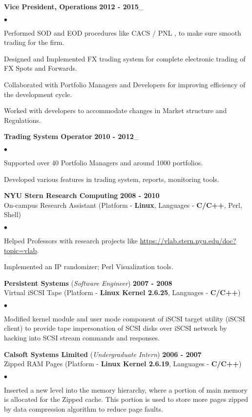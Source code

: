 \documentclass[margin,line]{res}
\newenvironment{list2}{
  \begin{list}{$\bullet$}{%
      \setlength{\itemsep}{0.05in}
      \setlength{\parsep}{0in} \setlength{\parskip}{0in}
      \setlength{\topsep}{-0.1in} \setlength{\partopsep}{0in}
      \setlength{\leftmargin}{0.2in}}}{\end{list}}
\begin{document}
\begin{resume}
{\bf Vice President, Operations} \hfill {\bf 2012 - 2015}\_
\begin{list2}
\item Performed SOD and EOD procedures like CACS / PNL , to make sure smooth trading for the firm.
\item Designed and Implemented FX trading system for complete electronic trading of FX Spots and Forwards.
\item Collaborated with Portfolio Managers and Developers for improving efficiency of the development cycle.
\item Worked with developers to accommodate changes in Market structure and Regulations.
\end{list2}

{\bf Trading System Operator} \hfill {\bf 2010 - 2012}\_
\begin{list2}
\item Supported over 40 Portfolio Managers and around 1000 portfolios.
\item Developed various features in trading system, reports, monitoring tools.
\end{list2}


\vspace {0.1in}
{\bf NYU Stern Research Computing} \hfill {\bf 2008 - 2010}\\
On-campus Research Assistant (Platform - {\bf Linux}, Languages - {\bf C/C++}, Perl, Shell)
\begin{list2}
\item Helped Professors with research projects like \href{https://vlab.stern.nyu.edu/doc?topic=vlab}{https://vlab.stern.nyu.edu/doc?topic=vlab}.
\item Implemented an IP randomizer; Perl Visualization tools.
\end{list2}

{\bf Persistent Systems} ({\em Software Engineer}) \hfill {\bf 2007 - 2008}\\
Virtual iSCSI Tape (Platform - {\bf Linux Kernel 2.6.25}, Languages - {\bf C/C++})
\begin{list2}
\item Modified kernel module and user mode component of iSCSI target utility (iSCSI client) to provide
tape impersonation of SCSI disks over iSCSI network by hacking into SCSI stream commands and responses.
\end{list2}

{\bf Calsoft Systems Limited} ({\em Undergraduate Intern}) \hfill {\bf 2006 - 2007}\\
Zipped RAM Pages (Platform - {\bf Linux Kernel 2.6.19}, Languages - {\bf C/C++})
\begin{list2}
\item Inserted a new level into the memory hierarchy, where a portion of main memory is allocated for the Zipped cache. This portion is used to store more pages zipped by data compression algorithm to reduce page faults.
\end{list2}



\end{resume}
\end{document}

